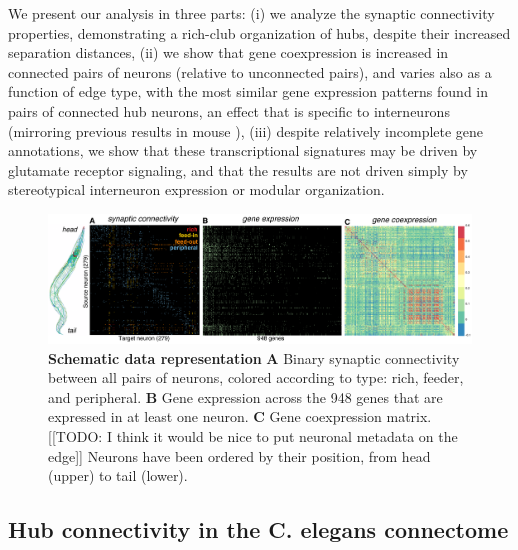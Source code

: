 \documentclass[10pt,letterpaper]{article}
\begin{document}
We present our analysis in three parts:
(i) we analyze the synaptic connectivity properties, demonstrating a rich-club organization of hubs, despite their increased separation distances,
(ii) we show that gene coexpression is increased in connected pairs of neurons (relative to unconnected pairs), and varies also as a function of edge type, with the most similar gene expression patterns found in pairs of connected hub neurons, an effect that is specific to interneurons (mirroring previous results in mouse \cite{Fulcher:2016ck}),
(iii) despite relatively incomplete gene annotations, we show that these transcriptional signatures may be driven by glutamate receptor signaling, and that the results are not driven simply by stereotypical interneuron expression or modular organization.

\begin{figure}[t]
  \centering
    \includegraphics[width=1\textwidth]{schematic.pdf}
 \caption{\textbf{Schematic data representation}
 \textbf{A} Binary synaptic connectivity between all pairs of neurons, colored according to type: rich, feeder, and peripheral.
  \textbf{B} Gene expression across the 948 genes that are expressed in at least one neuron.
 \textbf{C} Gene coexpression matrix.
[[TODO: I think it would be nice to put neuronal metadata on the edge]]
Neurons have been ordered by their position, from head (upper) to tail (lower).
}
\label{fig:SchematicRepresentation}
\end{figure}


\subsection*{Hub connectivity in the C. elegans connectome}
\end{document}
